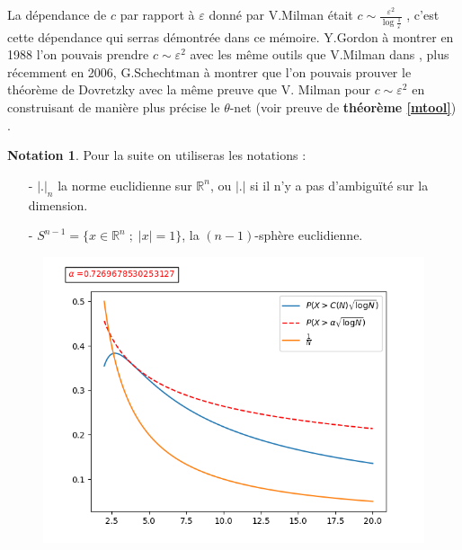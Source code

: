 \documentclass[12pt]{article}
\theoremstyle{definition}
\newtheorem*{notation}{Notation}
\begin{document}
La dépendance de $c$ par rapport à $\varepsilon$ donné par V.Milman était $c \sim \frac{\varepsilon^2}{\log{\frac{1}{\varepsilon}}}$ \cite{VM1}, c'est cette dépendance qui serras démontrée dans ce mémoire. Y.Gordon à montrer en 1988 l'on pouvais prendre $c\sim \varepsilon^2$ avec les même outils que V.Milman dans \cite{YG}, plus récemment en 2006, G.Schechtman à montrer que l'on pouvais prouver le théorème de Dovretzky avec la même preuve que V. Milman pour $c\sim \varepsilon^2$  en construisant de manière plus précise le $\theta$-net \cite{GS2} (voir preuve de \textbf{théorème \ref{mtool}}) .
\newpage\begin{notation}
	Pour la suite on utiliseras les notations : 
	\begin{enumerate}
		\item[-] $|.|_n$ la norme euclidienne sur $\mathbb{R}^n$, ou $|.|$ si il n'y a pas d'ambiguïté sur la dimension.
		\item[-] $S^{n-1} = \big\{x\in \mathbb{R}^n\; ;\; |x|=1\big\}$, la $(n-1)$-sphère euclidienne. 
	\end{enumerate}
\end{notation}

\begin{figure}
	\centering
	\includegraphics[scale=0.4]{figure_1.png}
\end{figure}
\end{document}
